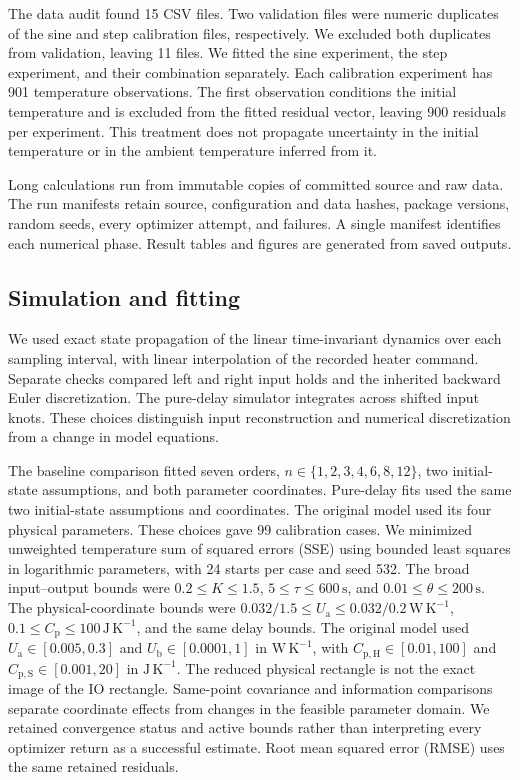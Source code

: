 \documentclass[11pt]{article}
\newcommand{\Ua}{U_{\mathrm a}}
\newcommand{\Ub}{U_{\mathrm b}}
\newcommand{\Cp}{C_{\mathrm p}}
\newcommand{\CpH}{C_{\mathrm{p,H}}}
\newcommand{\CpS}{C_{\mathrm{p,S}}}
\begin{document}
The data audit found 15 CSV files. Two validation files were numeric duplicates
of the sine and step calibration files, respectively. We excluded both duplicates
from validation, leaving 11 files. We fitted the sine experiment, the step
experiment, and their combination separately. Each calibration experiment has
901 temperature observations. The first observation conditions the initial
temperature and is excluded from the fitted residual vector, leaving 900
residuals per experiment. This treatment does not propagate uncertainty in the
initial temperature or in the ambient temperature inferred from it.

Long calculations run from immutable copies of committed source and raw data.
The run manifests retain source, configuration and data hashes, package versions,
random seeds, every optimizer attempt, and failures. A single manifest identifies
each numerical phase. Result tables and figures are generated from saved outputs.

\subsection{Simulation and fitting}
We used exact state propagation of the linear time-invariant dynamics over each
sampling interval, with linear interpolation of the recorded heater command.
Separate checks compared left and right input holds and the inherited backward
Euler discretization. The pure-delay simulator integrates across shifted input
knots. These choices distinguish input reconstruction and numerical discretization
from a change in model equations.

The baseline comparison fitted seven orders, $n\in\{1,2,3,4,6,8,12\}$, two
initial-state assumptions, and both parameter coordinates. Pure-delay fits used
the same two initial-state assumptions and coordinates. The original model used
its four physical parameters. These choices gave 99 calibration cases.
We minimized unweighted temperature sum of squared errors (SSE) using bounded
least squares in logarithmic parameters, with 24 starts per case and seed 532.
The broad input--output bounds were $0.2\leq K\leq1.5$,
$5\leq\tau\leq600\,\mathrm{s}$, and
$0.01\leq\theta\leq200\,\mathrm{s}$. The physical-coordinate bounds were
$0.032/1.5\leq\Ua\leq0.032/0.2\,\mathrm{W\,K^{-1}}$,
$0.1\leq\Cp\leq100\,\mathrm{J\,K^{-1}}$, and the same delay bounds.
The original model used $\Ua\in[0.005,0.3]$ and
$\Ub\in[0.0001,1]$ in $\mathrm{W\,K^{-1}}$, with
$\CpH\in[0.01,100]$ and $\CpS\in[0.001,20]$ in
$\mathrm{J\,K^{-1}}$. The reduced physical rectangle is not the exact image
of the IO rectangle. Same-point covariance and information comparisons separate
coordinate effects from changes in the feasible parameter domain.
We retained convergence status and active bounds rather than interpreting every
optimizer return as a successful estimate.
Root mean squared error (RMSE) uses the same retained residuals.
\end{document}

